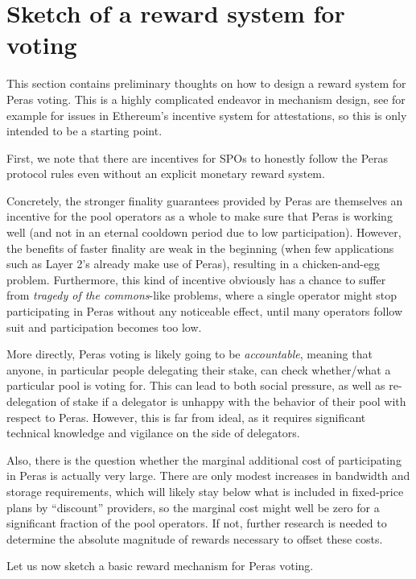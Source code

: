 \chapter{Sketch of a reward system for voting}\label{chap:rewards}

This section contains preliminary thoughts on how to design a reward system for Peras voting.
This is a highly complicated endeavor in mechanism design, see for example \cite{zhang2024max} for issues in Ethereum's incentive system for attestations, so this is only intended to be a starting point.

\medskip
First, we note that there are incentives for SPOs to honestly follow the Peras protocol rules even without an explicit monetary reward system.

Concretely, the stronger finality guarantees provided by Peras are themselves an incentive for the pool operators as a whole to make sure that Peras is working well (and not in an eternal cooldown period due to low participation).
However, the benefits of faster finality are weak in the beginning (when few applications such as Layer 2's already make use of Peras), resulting in a chicken-and-egg problem.
Furthermore, this kind of incentive obviously has a chance to suffer from \emph{tragedy of the commons}-like problems, where a single operator might stop participating in Peras without any noticeable effect, until many operators follow suit and participation becomes too low.

More directly, Peras voting is likely going to be \emph{accountable}, meaning that anyone, in particular people delegating their stake, can check whether/what a particular pool is voting for.
This can lead to both social pressure, as well as re-delegation of stake if a delegator is unhappy with the behavior of their pool with respect to Peras.
However, this is far from ideal, as it requires significant technical knowledge and vigilance on the side of delegators.

Also, there is the question whether the marginal additional cost of participating in Peras is actually very large.
There are only modest increases in bandwidth and storage requirements, which will likely stay below what is included in fixed-price plans by \enquote{discount} providers, so the marginal cost might well be zero for a significant fraction of the pool operators.
If not, further research is needed to determine the absolute magnitude of rewards necessary to offset these costs.

\medskip
Let us now sketch a basic reward mechanism for Peras voting.

